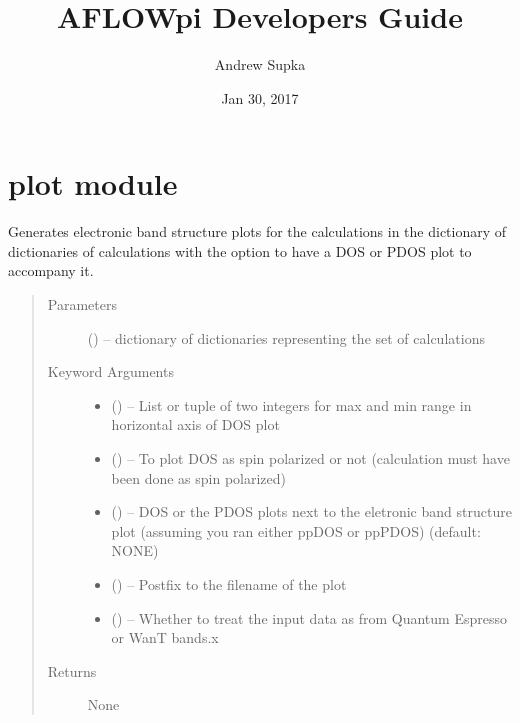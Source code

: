 \documentclass[letterpaper,10pt,english]{sphinxmanual}
\title{AFLOWpi Developers Guide}
\date{Jan 30, 2017}
\author{Andrew Supka}
\begin{document}
\maketitle
\sphinxtableofcontents
{}\label{\detokenize{index::doc}}



\chapter{plot module}
\label{\detokenize{plot:module-plot}}\label{\detokenize{plot::doc}}\label{\detokenize{plot:plot-module}}\label{\detokenize{plot:welcome-to-aflowpi-s-documentation}}

\begin{fulllineitems}
\label{\detokenize{plot:plot.bands}}
Generates electronic band structure plots for the calculations in the dictionary of dictionaries
of calculations with the option to have a DOS or PDOS plot to accompany it.
\begin{quote}\begin{description}
\item[{Parameters}] \leavevmode
{} () -- dictionary of dictionaries representing the set of calculations

\item[{Keyword Arguments}] \leavevmode\begin{itemize}
\item {} 
 () -- List or tuple of two integers for max and min range in horizontal axis of DOS plot

\item {} 
 () -- To plot DOS as spin polarized or not (calculation must have been done as spin polarized)

\item {} 
 () -- DOS or the PDOS plots next to the eletronic band structure plot (assuming you ran
either ppDOS or ppPDOS) (default: NONE)

\item {} 
 () -- Postfix to the filename of the plot

\item {} 
 () -- Whether to treat the input data as from Quantum Espresso or WanT bands.x

\end{itemize}

\item[{Returns}] \leavevmode
None

\end{description}\end{quote}

\end{fulllineitems}
\end{document}
